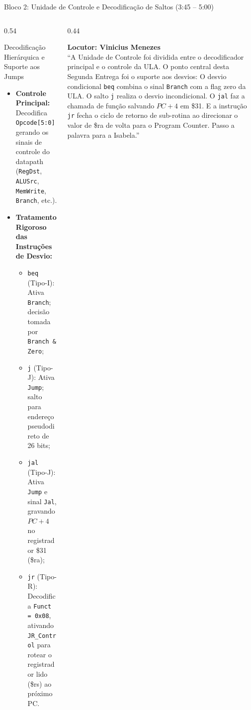 \documentclass[aspectratio=169, 10pt]{beamer}
\begin{document}
\begin{frame}{Bloco 2: Unidade de Controle e Decodificação de Saltos (3:45 -- 5:00)}
  \begin{columns}[T]
    \begin{column}{0.54\textwidth}
      \begin{block}{Decodificação Hierárquica e Suporte aos Jumps}
        \footnotesize
        \begin{itemize}\setlength{\itemsep}{1pt}
          \item \textbf{Controle Principal:} Decodifica \texttt{Opcode[5:0]} gerando os sinais de controle do datapath (\texttt{RegDst}, \texttt{ALUSrc}, \texttt{MemWrite}, \texttt{Branch}, etc.).
          \item \textbf{Tratamento Rigoroso das Instruções de Desvio:}
            \begin{itemize}
              \item \texttt{beq} (Tipo-I): Ativa \texttt{Branch}; decisão tomada por \texttt{Branch \& Zero};
              \item \texttt{j} (Tipo-J): Ativa \texttt{Jump}; salto para endereço pseudodireto de 26 bits;
              \item \texttt{jal} (Tipo-J): Ativa \texttt{Jump} e sinal \texttt{Jal}, gravando $PC+4$ no registrador \$31 (\$ra);
              \item \texttt{jr} (Tipo-R): Decodifica \texttt{Funct = 0x08}, ativando \texttt{JR\_Control} para rotear o registrador lido (\$rs) ao próximo PC.
            \end{itemize}
        \end{itemize}
      \end{block}
    \end{column}

    \begin{column}{0.44\textwidth}
      \begin{tcolorbox}[speakerbox]
        \textbf{Locutor: Vinicius Menezes}\\
        \vspace{1mm}
        \scriptsize
        ``A Unidade de Controle foi dividida entre o decodificador principal e o controle da ULA.
        O ponto central desta Segunda Entrega foi o suporte aos desvios:
        O desvio condicional \texttt{beq} combina o sinal \texttt{Branch} com a flag zero da ULA.
        O salto \texttt{j} realiza o desvio incondicional.
        O \texttt{jal} faz a chamada de função salvando $PC+4$ em \$31.
        E a instrução \texttt{jr} fecha o ciclo de retorno de sub-rotina ao direcionar o valor de \$ra de volta para o Program Counter.
        Passo a palavra para a Isabela.''
      \end{tcolorbox}
    \end{column}
  \end{columns}
\end{frame}
\end{document}
